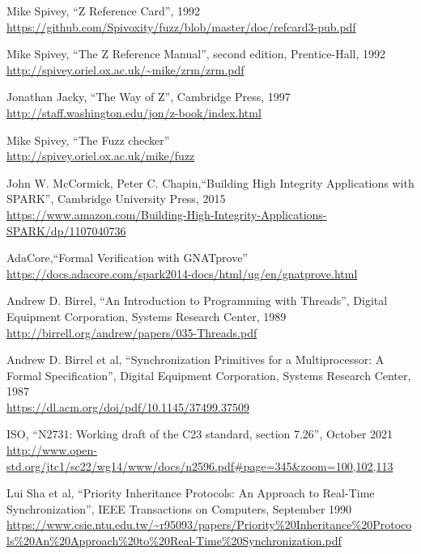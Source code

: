 \documentclass[11pt,letterpaper,twoside,openany]{book}
\begin{document}
\begin{thebibliography}{9}

Mike Spivey, ``Z Reference Card'', 1992 \\
\url{https://github.com/Spivoxity/fuzz/blob/master/doc/refcard3-pub.pdf}

Mike Spivey, ``The Z Reference Manual'', second edition, Prentice-Hall, 1992 \\
\url{http://spivey.oriel.ox.ac.uk/~mike/zrm/zrm.pdf}

Jonathan Jacky, ``The Way of Z'', Cambridge Press, 1997 \\
\url{http://staff.washington.edu/jon/z-book/index.html}

Mike Spivey, ``The Fuzz checker'' \\
\url{http://spivey.oriel.ox.ac.uk/mike/fuzz}

John W. McCormick, Peter C. Chapin,``Building High Integrity Applications with SPARK'', Cambridge University Press, 2015 \\
\url{https://www.amazon.com/Building-High-Integrity-Applications-SPARK/dp/1107040736}

AdaCore,``Formal Verification with GNATprove'' \\
\url{https://docs.adacore.com/spark2014-docs/html/ug/en/gnatprove.html}

Andrew D. Birrel, ``An Introduction to Programming with Threads'',
Digital Equipment Corporation, Systems Research Center, 1989 \\
\url{http://birrell.org/andrew/papers/035-Threads.pdf}

Andrew D. Birrel et al, ``Synchronization Primitives for a Multiprocessor: A Formal Specification'',
Digital Equipment Corporation, Systems Research Center, 1987 \\
\url{https://dl.acm.org/doi/pdf/10.1145/37499.37509}

ISO, ``N2731: Working draft of the C23 standard, section 7.26'', October 2021 \\
\url{http://www.open-std.org/jtc1/sc22/wg14/www/docs/n2596.pdf#page=345&zoom=100,102,113}

Lui Sha et al, ``Priority Inheritance Protocols: An Approach to Real-Time Synchronization'', IEEE Transactions on Computers, September 1990 \\
\url{https://www.csie.ntu.edu.tw/~r95093/papers/Priority%20Inheritance%20Protocols%20An%20Approach%20to%20Real-Time%20Synchronization.pdf}


\end{thebibliography}
\end{document}
